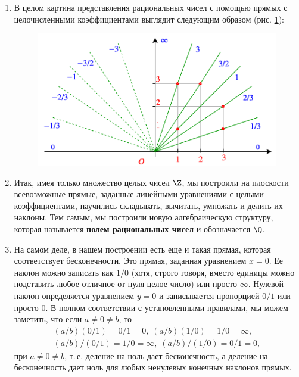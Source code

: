 \begin{enumerate}
\item В целом картина представления рациональных чисел с помощью прямых с целочисленными коэффициентами выглядит следующим образом (рис. \ref{ratio}):
\begin{figure}[htb!]
\begin{center}
\includegraphics[scale=0.4]{ratio.png}
\end{center}
\caption{}\label{ratio}
\end{figure}
\item Итак, имея только множество целых чисел $\Z$, мы построили на плоскости всевозможные прямые, заданные линейными уравнениями с целыми коэффициентами, научились складывать, вычитать, умножать и делить их наклоны. Тем самым, мы построили новую алгебраическую структуру, которая называется \textbf{полем рациональных чисел} и обозначается $\Q$.

\item На самом деле, в нашем построении есть еще и такая прямая, которая соответствует бесконечности. Это прямая, заданная уравнением $x=0$. Ее наклон можно записать как $1/0$ (хотя, строго говоря, вместо единицы можно подставить любое отличное от нуля целое число) или просто $\infty$. Нулевой наклон определяется уравнением $y=0$ и записывается пропорцией $0/1$ или просто $0$. В полном соответствии с установленными правилами, мы можем заметить, что если $a\ne 0 \ne b$, то
\begin{gather*}
(a/b)(0/1)=0/1=0,\;(a/b)(1/0)=1/0=\infty,\\ 
(a/b)/(0/1)=1/0=\infty,\;(a/b)/(1/0)=0/1=0,
\end{gather*}
при $a\ne 0\ne b$,
т.\,е. деление на ноль дает бесконечность, а деление на бесконечность дает ноль для любых ненулевых конечных наклонов прямых.


\end{enumerate}
